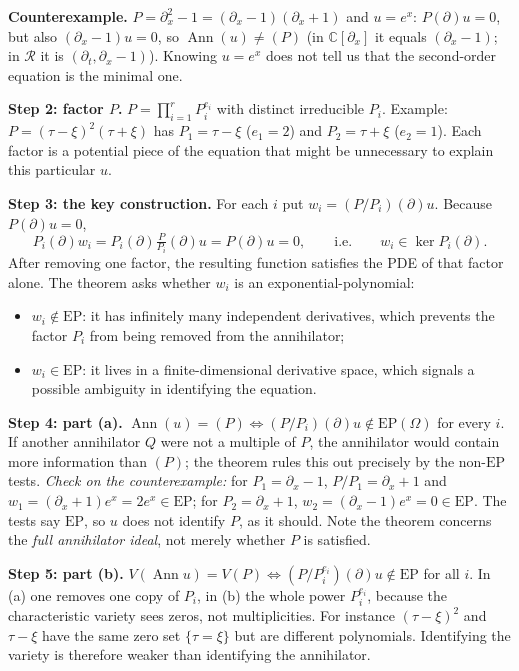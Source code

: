 \documentclass[11pt]{article}
\theoremstyle{plain}
\theoremstyle{definition}
\theoremstyle{remark}
\newcommand{\C}{\mathbb{C}}
\newcommand{\ring}{\mathcal{R}}            %
\DeclareMathOperator{\Ann}{Ann}             %
\newcommand{\Var}{V}                        %
\newcommand{\EP}{\mathrm{EP}}               %
\begin{document}
\medskip\textbf{Counterexample.} $P=\partial_x^2-1=(\partial_x-1)(\partial_x+1)$ and $u=e^x$: $P(\partial)u=0$, but also $(\partial_x-1)u=0$, so $\Ann(u)\ne(P)$ (in $\C[\partial_x]$ it equals $(\partial_x-1)$; in $\ring$ it is $(\partial_t,\partial_x-1)$). Knowing $u=e^x$ does not tell us that the second-order equation is the minimal one.

\medskip\textbf{Step 2: factor $P$.} $P=\prod_{i=1}^rP_i^{e_i}$ with distinct irreducible $P_i$. Example: $P=(\tau-\xi)^2(\tau+\xi)$ has $P_1=\tau-\xi$ ($e_1=2$) and $P_2=\tau+\xi$ ($e_2=1$). Each factor is a potential piece of the equation that might be unnecessary to explain this particular $u$.

\medskip\textbf{Step 3: the key construction.} For each $i$ put $w_i=(P/P_i)(\partial)u$. Because $P(\partial)u=0$,
\[
P_i(\partial)w_i=P_i(\partial)\tfrac{P}{P_i}(\partial)u=P(\partial)u=0,\qquad\text{i.e.}\qquad w_i\in\ker P_i(\partial).
\]
After removing one factor, the resulting function satisfies the PDE of that factor alone. The theorem asks whether $w_i$ is an exponential-polynomial:
\begin{itemize}[nosep]
\item $w_i\notin\EP$: it has infinitely many independent derivatives, which prevents the factor $P_i$ from being removed from the annihilator;
\item $w_i\in\EP$: it lives in a finite-dimensional derivative space, which signals a possible ambiguity in identifying the equation.
\end{itemize}

\medskip\textbf{Step 4: part (a).} $\Ann(u)=(P)\iff(P/P_i)(\partial)u\notin\EP(\Omega)$ for every $i$. If another annihilator $Q$ were not a multiple of $P$, the annihilator would contain more information than $(P)$; the theorem rules this out precisely by the non-$\EP$ tests. \emph{Check on the counterexample:} for $P_1=\partial_x-1$, $P/P_1=\partial_x+1$ and $w_1=(\partial_x+1)e^x=2e^x\in\EP$; for $P_2=\partial_x+1$, $w_2=(\partial_x-1)e^x=0\in\EP$. The tests say $\EP$, so $u$ does not identify $P$, as it should. Note the theorem concerns the \emph{full annihilator ideal}, not merely whether $P$ is satisfied.

\medskip\textbf{Step 5: part (b).} $\Var(\Ann u)=\Var(P)\iff(P/P_i^{e_i})(\partial)u\notin\EP$ for all $i$. In (a) one removes one copy of $P_i$, in (b) the whole power $P_i^{e_i}$, because the characteristic variety sees zeros, not multiplicities. For instance $(\tau-\xi)^2$ and $\tau-\xi$ have the same zero set $\{\tau=\xi\}$ but are different polynomials. Identifying the variety is therefore weaker than identifying the annihilator.
\end{document}

